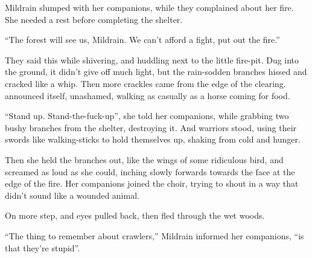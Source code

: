 \begin{multicols}{2}
\begin{exampletext}
  Mildrain slumped with her companions, while they complained about her fire.
  She needed a rest before completing the shelter.

  ``The forest will see us, Mildrain.
  We can't afford a fight, put out the fire.''

  They said this while shivering, and huddling next to the little fire-pit.
  Dug into the ground, it didn't give off much light, but the rain-sodden branches hissed and cracked like a whip.
  Then more crackles came from the edge of the clearing.
   announced itself, unashamed, walking as casually as a horse coming for food.

  ``Stand up.
  Stand-the-fuck-up'', she told her companions, while grabbing two bushy branches from the shelter, destroying it.
  And warriors stood, using their swords like walking-sticks to hold themselves up, shaking from cold and hunger.

  Then she held the branches out, like the wings of some ridiculous bird, and screamed as loud as she could, inching slowly forwards towards the face at the edge of the fire.
  Her companions joined the choir, trying to shout in a way that didn't sound like a wounded animal.

  On more step, and eyes pulled back, then fled through the wet woods.

  ``The thing to remember about \glspl{crawler},''
  Mildrain informed her companions,
  ``is that they're stupid''.

\end{exampletext}

\end{multicols}

